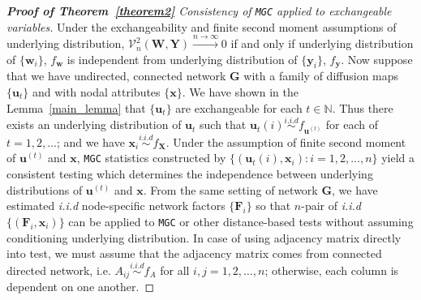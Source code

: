 \documentclass[11pt]{article}
\theoremstyle{definition}
\begin{document}
\begin{proof}[\textbf{Proof of Theorem~\ref{theorem2}} Consistency of \texttt{MGC} applied to exchangeable variables]
	
Under the exchangeability and finite second moment assumptions of underlying distribution, $\mathcal{V}^{2}_{n}(\mathbf{W},\mathbf{Y}) \xrightarrow{n \rightarrow \infty}  0$ if and only if underlying distribution of $\{\mathbf{w}_{i} \}$, $f_{\mathbf{w}}$ is independent from underlying distribution of $\{ \mathbf{y}_{i}  \}$, $f_{\mathbf{y}}$. Now suppose that we have undirected, connected network $\mathbf{G}$ with a family of diffusion maps $\{ \mathbf{u}_{t}  \}$ and with nodal attributes $\{ \mathbf{x}  \}$. We have shown in the Lemma~\ref{main_lemma} that $\{ \mathbf{u}_{t}  \}$ are exchangeable for each $t \in \mathbb{N}$. Thus there exists an underlying distribution of $\mathbf{u}_{t}$ such that $\mathbf{u}_{t}(i) \overset{i.i.d}{\sim} f_{\mathbf{u}^{(t)}}$ for each of $t= 1,2,\ldots $; and we have $\mathbf{x}_{i} \overset{i.i.d}{\sim} f_{\mathbf{X}}$. Under the assumption of finite second moment of $\mathbf{u}^{(t)}$ and $\mathbf{x}$, \texttt{MGC} statistics constructed by $\{  (  \mathbf{u}_{t}(i), \mathbf{x}_{i} ) : i = 1,2,\ldots, n  \}$ yield a consistent testing which determines the independence between underlying distributions of $\mathbf{u}^{(t)}$ and $\mathbf{x}$. From the same setting of network $\mathbf{G}$, we have estimated \textit{i.i.d} node-specific network factors $\{ \mathbf{F}_{i} \}$ so that $n$-pair of \textit{i.i.d} $\{ ( \mathbf{F}_{i}, \mathbf{x}_{i} )  \}$ can be applied to \texttt{MGC} or other distance-based tests without assuming conditioning underlying distribution. In case of using adjacency matrix directly into test, we must assume that the adjacency matrix comes from connected directed network, i.e. $A_{ij} \overset{i.i.d}{\sim} f_{A}$ for all $i,j=1,2,\ldots, n$; otherwise, each column is dependent on one another.  
\end{proof}
\end{document}
